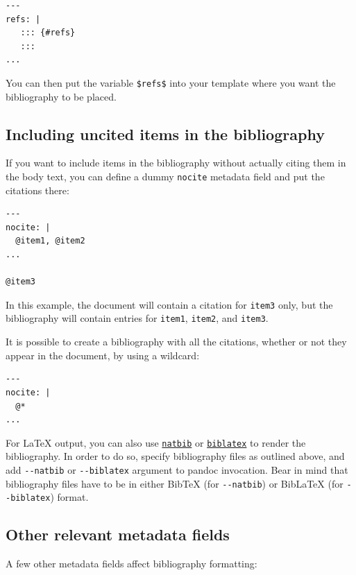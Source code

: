 \documentclass[
]{article}
\begin{document}
\begin{verbatim}
---
refs: |
   ::: {#refs}
   :::
...
\end{verbatim}

You can then put the variable \texttt{\$refs\$} into your template where
you want the bibliography to be placed.

\hypertarget{including-uncited-items-in-the-bibliography}{%
\subsection{Including uncited items in the
bibliography}\label{including-uncited-items-in-the-bibliography}}

If you want to include items in the bibliography without actually citing
them in the body text, you can define a dummy \texttt{nocite} metadata
field and put the citations there:

\begin{verbatim}
---
nocite: |
  @item1, @item2
...

@item3
\end{verbatim}

In this example, the document will contain a citation for \texttt{item3}
only, but the bibliography will contain entries for \texttt{item1},
\texttt{item2}, and \texttt{item3}.

It is possible to create a bibliography with all the citations, whether
or not they appear in the document, by using a wildcard:

\begin{verbatim}
---
nocite: |
  @*
...
\end{verbatim}

For LaTeX output, you can also use
\href{https://ctan.org/pkg/natbib}{\texttt{natbib}} or
\href{https://ctan.org/pkg/biblatex}{\texttt{biblatex}} to render the
bibliography. In order to do so, specify bibliography files as outlined
above, and add \texttt{-\/-natbib} or \texttt{-\/-biblatex} argument to
pandoc invocation. Bear in mind that bibliography files have to be in
either BibTeX (for \texttt{-\/-natbib}) or BibLaTeX (for
\texttt{-\/-biblatex}) format.

\hypertarget{other-relevant-metadata-fields}{%
\subsection{Other relevant metadata
fields}\label{other-relevant-metadata-fields}}

A few other metadata fields affect bibliography formatting:
\end{document}
